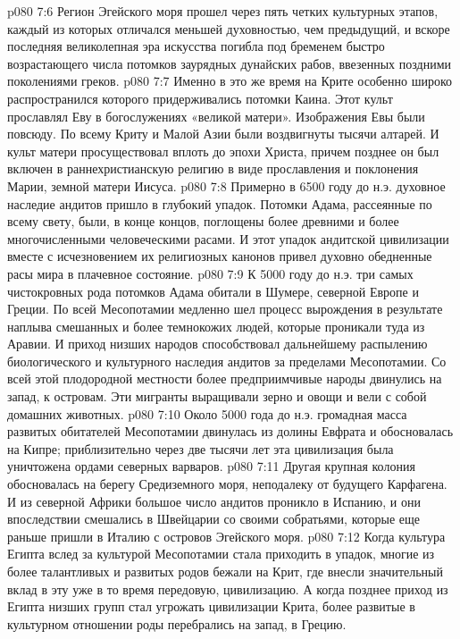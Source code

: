 \vs p080 7:6 Регион Эгейского моря прошел через пять четких культурных этапов, каждый из которых отличался меньшей духовностью, чем предыдущий, и вскоре последняя великолепная эра искусства погибла под бременем быстро возрастающего числа потомков заурядных дунайских рабов, ввезенных поздними поколениями греков.
\vs p080 7:7 Именно в это же время на Крите особенно широко распространился  которого придерживались потомки Каина. Этот культ прославлял Еву в богослужениях «великой матери». Изображения Евы были повсюду. По всему Криту и Малой Азии были воздвигнуты тысячи алтарей. И культ матери просуществовал вплоть до эпохи Христа, причем позднее он был включен в раннехристианскую религию в виде прославления и поклонения Марии, земной матери Иисуса.
\vs p080 7:8 \pc Примерно в 6500 году до н.э. духовное наследие андитов пришло в глубокий упадок. Потомки Адама, рассеянные по всему свету, были, в конце концов, поглощены более древними и более многочисленными человеческими расами. И этот упадок андитской цивилизации вместе с исчезновением их религиозных канонов привел духовно обедненные расы мира в плачевное состояние.
\vs p080 7:9 \pc К 5000 году до н.э. три самых чистокровных рода потомков Адама обитали в Шумере, северной Европе и Греции. По всей Месопотамии медленно шел процесс вырождения в результате наплыва смешанных и более темнокожих людей, которые проникали туда из Аравии. И приход низших народов способствовал дальнейшему распылению биологического и культурного наследия андитов за пределами Месопотамии. Со всей этой плодородной местности более предприимчивые народы двинулись на запад, к островам. Эти мигранты выращивали зерно и овощи и вели с собой домашних животных.
\vs p080 7:10 Около 5000 года до н.э. громадная масса развитых обитателей Месопотамии двинулась из долины Евфрата и обосновалась на Кипре; приблизительно через две тысячи лет эта цивилизация была уничтожена ордами северных варваров.
\vs p080 7:11 \pc Другая крупная колония обосновалась на берегу Средиземного моря, неподалеку от будущего Карфагена. И из северной Африки большое число андитов проникло в Испанию, и они впоследствии смешались в Швейцарии со своими собратьями, которые еще раньше пришли в Италию с островов Эгейского моря.
\vs p080 7:12 \pc Когда культура Египта вслед за культурой Месопотамии стала приходить в упадок, многие из более талантливых и развитых родов бежали на Крит, где внесли значительный вклад в эту уже в то время передовую, цивилизацию. А когда позднее приход из Египта низших групп стал угрожать цивилизации Крита, более развитые в культурном отношении роды перебрались на запад, в Грецию.
